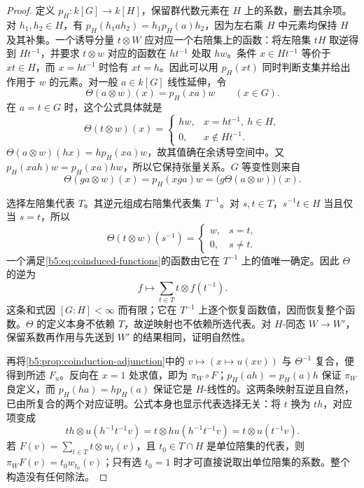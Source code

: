 \begin{proof}
	定义 \(p_H:k[G]\rightarrow k[H]\)，保留群代数元素在 \(H\) 上的系数，删去其余项。对 \(h_1,h_2\in H\)，有 \(p_H(h_1ah_2)=h_1p_H(a)h_2\)，因为左右乘 \(H\) 中元素均保持 \(H\) 及其补集。一个诱导分量 \(t\otimes W\) 应对应一个右陪集上的函数：将左陪集 \(tH\) 取逆得到 \(Ht^{-1}\)，并要求 \(t\otimes w\) 对应的函数在 \(ht^{-1}\) 处取 \(hw\)。条件 \(x\in Ht^{-1}\) 等价于 \(xt\in H\)，而 \(x=ht^{-1}\) 时恰有 \(xt=h\)。因此可以用 \(p_H(xt)\) 同时判断支集并给出作用于 \(w\) 的元素。对一般 \(a\in k[G]\) 线性延伸，令
	\[
		\Theta(a\otimes w)(x)=p_H(xa)w\qquad(x\in G).
	\]
	在 \(a=t\in G\) 时，这个公式具体就是
	\[
		\Theta(t\otimes w)(x)=
		\begin{cases}hw,&x=ht^{-1},\ h\in H,\\0,&x\notin Ht^{-1}.\end{cases}
	\]
	\(\Theta(a\otimes w)(hx)=hp_H(xa)w\)，故其值确在余诱导空间中。又 \(p_H(xah)w=p_H(xa)hw\)，所以它保持张量关系。\(G\) 等变性则来自
	\[
		\Theta(ga\otimes w)(x)=p_H(xga)w =\bigl(g\Theta(a\otimes w)\bigr)(x).
	\]

	选择左陪集代表 \(T\)。其逆元组成右陪集代表集 \(T^{-1}\)。对 \(s,t\in T\)，\(s^{-1}t\in H\) 当且仅当 \(s=t\)，所以
	\[
		\Theta(t\otimes w)(s^{-1})=
		\begin{cases}w,&s=t,\\0,&s\ne t.\end{cases}
	\]
	一个满足\eqref{b5:eq:coinduced-functions}的函数由它在 \(T^{-1}\) 上的值唯一确定。因此 \(\Theta\) 的逆为
	\[
		f\longmapsto\sum_{t\in T}t\otimes f(t^{-1}).
	\]
	这条和式因 \([G:H]<\infty\) 而有限；它在 \(T^{-1}\) 上逐个恢复函数值，因而恢复整个函数。\(\Theta\) 的定义本身不依赖 \(T\)，故逆映射也不依赖所选代表。对 \(H\)-同态 \(W\rightarrow W'\)，保留系数再作用与先送到 \(W'\) 的结果相同，证明自然性。

	再将\cref{b5:prop:coinduction-adjunction}中的 \(v\mapsto(x\mapsto u(xv))\) 与 \(\Theta^{-1}\) 复合，便得到所述 \(F_u\)。反向在 \(x=1\) 处求值，即为 \(\pi_W\circ F\)；\(p_H(ah)=p_H(a)h\) 保证 \(\pi_W\) 良定义，而 \(p_H(ha)=hp_H(a)\) 保证它是 \(H\)-线性的。这两条映射互逆且自然，已由所复合的两个对应证明。公式本身也显示代表选择无关：将 \(t\) 换为 \(th\)，对应项变成
	\[
		th\otimes u(h^{-1}t^{-1}v) =t\otimes h u(h^{-1}t^{-1}v) =t\otimes u(t^{-1}v).
	\]
	若 \(F(v)=\sum_{t\in T}t\otimes w_t(v)\)，且 \(t_0\in T\cap H\) 是单位陪集的代表，则 \(\pi_WF(v)=t_0w_{t_0}(v)\)；只有选 \(t_0=1\) 时才可直接说取出单位陪集的系数。整个构造没有任何除法。
\end{proof}


